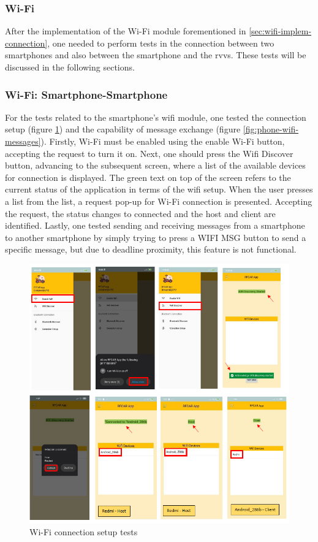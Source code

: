\subsubsection{Wi-Fi}%
\label{sec:wifi-test}
%
After the implementation of the Wi-Fi module forementioned in \ref{sec:wifi-implem-connection}, one needed to perform tests in the connection between two smartphones and also between the smartphone and the \gls{rvvs}. These tests will be discussed in the following sections. 
%
\subsubsection{Wi-Fi: Smartphone-Smartphone}
\label{sec:wifi-phone-phone}
%
For the tests related to the smartphone's wifi module, one tested the connection setup (figure \ref{fig:phone-wifi-setup}) and the capability of message exchange (figure \ref{fig:phone-wifi-messages}). Firstly, Wi-Fi must be enabled using the enable Wi-Fi button, accepting the request to turn it on. Next, one should press the Wifi Discover button, advancing to the subsequent screen, where a list of the available devices for connection is displayed. The green text on top of the screen refers to the current status of the application in terms of the wifi setup. When the user presses a list from the list, a request pop-up for Wi-Fi connection is presented. Accepting the request, the status changes to connected and the host and client are identified. Lastly, one tested sending and receiving messages from a smartphone to another smartphone by simply trying to press a WIFI MSG button to send a specific message, but due to deadline proximity, this feature is not functional.
%
\begin{figure}[!ht]
\centering
\includegraphics[width=\textwidth]{img/phone-wifi-setup.png}
\caption{\label{fig:phone-wifi-setup}Wi-Fi connection setup tests}
\end{figure}
